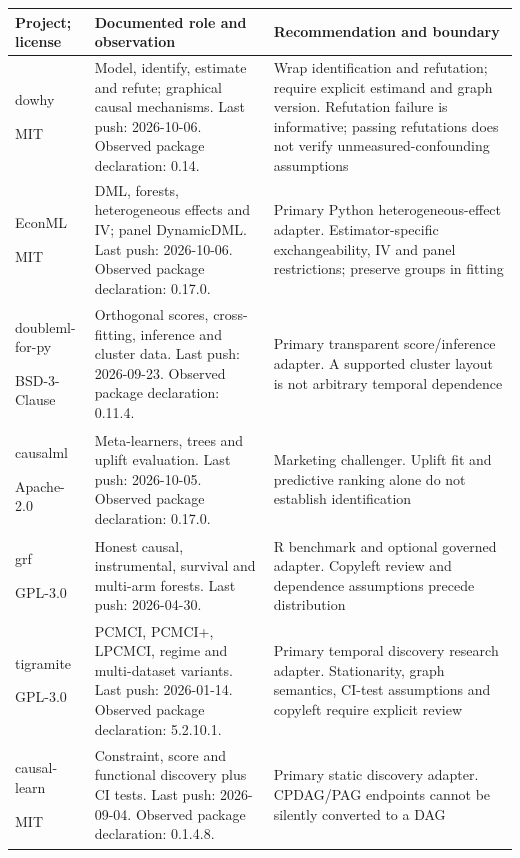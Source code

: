 \begin{longtable}{P{29mm}P{55mm}P{60mm}}
\toprule Project; license & Documented role and observation & Recommendation and boundary\\\midrule\endhead
dowhy \citep{sw_dowhy}\par MIT & Model, identify, estimate and refute; graphical causal mechanisms. Last push: 2026-10-06. Observed package declaration: 0.14. & Wrap identification and refutation; require explicit estimand and graph version. Refutation failure is informative; passing refutations does not verify unmeasured-confounding assumptions\\
EconML \citep{sw_econml}\par MIT & DML, forests, heterogeneous effects and IV; panel DynamicDML. Last push: 2026-10-06. Observed package declaration: 0.17.0. & Primary Python heterogeneous-effect adapter. Estimator-specific exchangeability, IV and panel restrictions; preserve groups in fitting\\
doubleml-for-py \citep{sw_doubleml}\par BSD-3-Clause & Orthogonal scores, cross-fitting, inference and cluster data. Last push: 2026-09-23. Observed package declaration: 0.11.4. & Primary transparent score/inference adapter. A supported cluster layout is not arbitrary temporal dependence\\
causalml \citep{sw_causalml}\par Apache-2.0 & Meta-learners, trees and uplift evaluation. Last push: 2026-10-05. Observed package declaration: 0.17.0. & Marketing challenger. Uplift fit and predictive ranking alone do not establish identification\\
grf \citep{sw_grf}\par GPL-3.0 & Honest causal, instrumental, survival and multi-arm forests. Last push: 2026-04-30. & R benchmark and optional governed adapter. Copyleft review and dependence assumptions precede distribution\\
tigramite \citep{sw_tigramite}\par GPL-3.0 & PCMCI, PCMCI+, LPCMCI, regime and multi-dataset variants. Last push: 2026-01-14. Observed package declaration: 5.2.10.1. & Primary temporal discovery research adapter. Stationarity, graph semantics, CI-test assumptions and copyleft require explicit review\\
causal-learn \citep{sw_causallearn}\par MIT & Constraint, score and functional discovery plus CI tests. Last push: 2026-09-04. Observed package declaration: 0.1.4.8. & Primary static discovery adapter. CPDAG/PAG endpoints cannot be silently converted to a DAG\\

\end{longtable}

